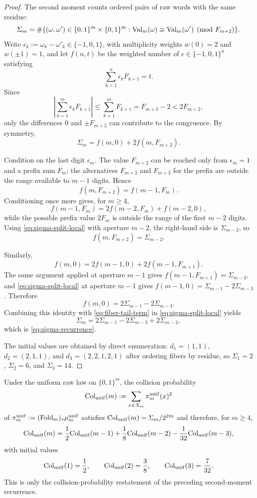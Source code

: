 \begin{proof}
The second moment counts ordered pairs of raw words with the same residue:
\[
\Sigma_m
=
\#\{(\omega,\omega')\in\{0,1\}^m\times\{0,1\}^m:
\mathrm{Val}_m(\omega)\equiv\mathrm{Val}_m(\omega')\pmod {F_{m+2}}\}.
\]
Write $\epsilon_k:=\omega_k-\omega'_k\in\{-1,0,1\}$, with multiplicity
weights $w(0)=2$ and $w(\pm1)=1$, and let $f(n,t)$ be the weighted number of
$\epsilon\in\{-1,0,1\}^n$ satisfying
\[
\sum_{k=1}^n\epsilon_kF_{k+1}=t.
\]
Since
\[
\left|\sum_{k=1}^m\epsilon_kF_{k+1}\right|
\le\sum_{k=1}^mF_{k+1}=F_{m+3}-2<2F_{m+2},
\]
only the differences $0$ and $\pm F_{m+2}$ can contribute to the congruence.
By symmetry,
\begin{equation}\label{eq:sigma-split-local}
\Sigma_m=f(m,0)+2f(m,F_{m+2}).
\end{equation}

Condition on the last digit $\epsilon_m$.  The value $F_{m+2}$ can be reached
only from $\epsilon_m=1$ and a prefix sum $F_m$; the alternatives
$F_{m+2}$ and $F_{m+3}$ for the prefix are outside the range available to
$m-1$ digits.  Hence
\[
f(m,F_{m+2})=f(m-1,F_m).
\]
Conditioning once more gives, for $m\ge4$,
\[
f(m-1,F_m)=2f(m-2,F_m)+f(m-2,0),
\]
while the possible prefix value $2F_m$ is outside the range of the first
$m-2$ digits.  Using \eqref{eq:sigma-split-local} with aperture $m-2$, the
right-hand side is $\Sigma_{m-2}$, so
\begin{equation}\label{eq:fiber-tail-term}
f(m,F_{m+2})=\Sigma_{m-2}.
\end{equation}

Similarly,
\[
f(m,0)=2f(m-1,0)+2f(m-1,F_{m+1}).
\]
The same argument applied at aperture $m-1$ gives
$f(m-1,F_{m+1})=\Sigma_{m-3}$, and
\eqref{eq:sigma-split-local} at aperture $m-1$ gives
$f(m-1,0)=\Sigma_{m-1}-2\Sigma_{m-3}$.  Therefore
\[
f(m,0)=2\Sigma_{m-1}-2\Sigma_{m-3}.
\]
Combining this identity with \eqref{eq:fiber-tail-term} in
\eqref{eq:sigma-split-local} yields
\[
\Sigma_m
=2\Sigma_{m-1}-2\Sigma_{m-3}+2\Sigma_{m-2},
\]
which is \eqref{eq:sigma-recurrence}.

The initial values are obtained by direct enumeration:
$d_1=(1,1)$, $d_2=(2,1,1)$, and $d_3=(2,2,1,2,1)$ after ordering fibers by
residue, so $\Sigma_1=2$, $\Sigma_2=6$, and $\Sigma_3=14$.
\end{proof}

\begin{proposition}\label{prop:uniform-collision}
Under the uniform raw law on $\{0,1\}^m$, the collision probability
\[
\mathrm{Col}_{\mathrm{unif}}(m):=
\sum_{x\in X_m}\pi_m^{\mathrm{unif}}(x)^2
\]
of $\pi_m^{\mathrm{unif}}:=(\mathrm{Fold}_m)_*\mu_m^{\mathrm{unif}}$ satisfies
$\mathrm{Col}_{\mathrm{unif}}(m)=\Sigma_m/2^{2m}$ and therefore, for $m\ge4$,
\[
\mathrm{Col}_{\mathrm{unif}}(m)
=\frac12\mathrm{Col}_{\mathrm{unif}}(m-1)
+\frac18\mathrm{Col}_{\mathrm{unif}}(m-2)
-\frac1{32}\mathrm{Col}_{\mathrm{unif}}(m-3),
\]
with initial values
\[
\mathrm{Col}_{\mathrm{unif}}(1)=\frac12,\qquad
\mathrm{Col}_{\mathrm{unif}}(2)=\frac38,\qquad
\mathrm{Col}_{\mathrm{unif}}(3)=\frac7{32}.
\]
This is only the collision-probability restatement of the preceding
second-moment recurrence.
\end{proposition}

